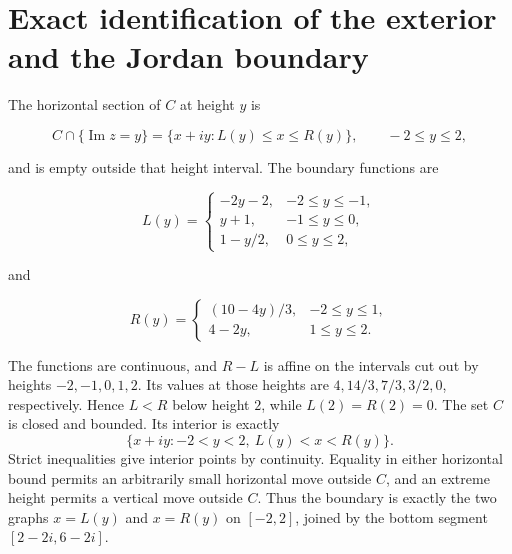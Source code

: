 \documentclass[11pt]{article}
\begin{document}
\section{Exact identification of the exterior and the Jordan boundary}\label{exact-identification-of-the-exterior-and-the-jordan-boundary}

The horizontal section of \(C\) at height \(y\) is

\[
C\cap\{\operatorname{Im}z=y\}
=\{x+iy:L(y)\le x\le R(y)\},\qquad -2\le y\le2,
\]

and is empty outside that height interval. The boundary functions are

\[
L(y)=
\begin{cases}
-2y-2,&-2\le y\le-1,\\
y+1,&-1\le y\le0,\\
1-y/2,&0\le y\le2,
\end{cases}
\]

and

\[
R(y)=
\begin{cases}
(10-4y)/3,&-2\le y\le1,\\
4-2y,&1\le y\le2.
\end{cases}
\]

The functions are continuous, and $R-L$ is affine on the intervals cut out by heights $-2,-1,0,1,2$. Its values at those heights are $4,14/3,7/3,3/2,0$, respectively. Hence $L<R$ below height $2$, while $L(2)=R(2)=0$. The set $C$ is closed and bounded. Its interior is exactly
\[
 \{x+iy:-2<y<2,\ L(y)<x<R(y)\}.
\]
Strict inequalities give interior points by continuity. Equality in either horizontal bound permits an arbitrarily small horizontal move outside $C$, and an extreme height permits a vertical move outside $C$. Thus the boundary is exactly the two graphs $x=L(y)$ and $x=R(y)$ on $[-2,2]$, joined by the bottom segment $[2-2i,6-2i]$.
\end{document}
